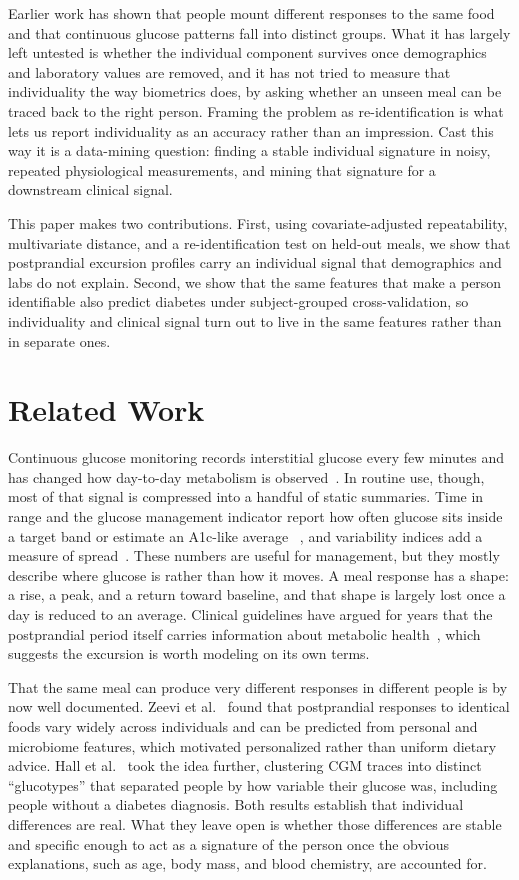 \documentclass[10pt,conference,compsoc]{IEEEtran}
\begin{document}
Earlier work has shown that people mount different responses to the same food and
that continuous glucose patterns fall into distinct groups. What it has largely
left untested is whether the individual component survives once demographics and
laboratory values are removed, and it has not tried to measure that individuality
the way biometrics does, by asking whether an unseen meal can be traced back to
the right person. Framing the problem as re-identification is what lets us report
individuality as an accuracy rather than an impression. Cast this way it is a
data-mining question: finding a stable individual signature in noisy, repeated
physiological measurements, and mining that signature for a downstream clinical
signal.

This paper makes two contributions. First, using covariate-adjusted
repeatability, multivariate distance, and a re-identification test on held-out
meals, we show that postprandial excursion profiles carry an individual signal
that demographics and labs do not explain. Second, we show that the same features
that make a person identifiable also predict diabetes under subject-grouped
cross-validation, so individuality and clinical signal turn out to live in the
same features rather than in separate ones.

\section{Related Work}

Continuous glucose monitoring records interstitial glucose every few minutes and
has changed how day-to-day metabolism is observed~\cite{danne2017}. In routine
use, though, most of that signal is compressed into a handful of static
summaries. Time in range and the glucose management indicator report how often
glucose sits inside a target band or estimate an A1c-like average~%
\cite{battelino2019,bergenstal2018}, and variability indices add a measure of
spread~\cite{monnier2008}. These numbers are useful for management, but they
mostly describe where glucose is rather than how it moves. A meal response has a
shape: a rise, a peak, and a return toward baseline, and that shape is largely
lost once a day is reduced to an average. Clinical guidelines have argued for
years that the postprandial period itself carries information about metabolic
health~\cite{ceriello2008}, which suggests the excursion is worth modeling on its
own terms.

That the same meal can produce very different responses in different people is by
now well documented. Zeevi et al.~\cite{zeevi2015} found that postprandial
responses to identical foods vary widely across individuals and can be predicted
from personal and microbiome features, which motivated personalized rather than
uniform dietary advice. Hall et al.~\cite{hall2018} took the idea further,
clustering CGM traces into distinct ``glucotypes'' that separated people by how
variable their glucose was, including people without a diabetes diagnosis. Both
results establish that individual differences are real. What they leave open is
whether those differences are stable and specific enough to act as a signature of
the person once the obvious explanations, such as age, body mass, and blood
chemistry, are accounted for.
\end{document}
